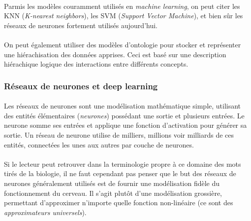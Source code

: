 \documentclass[a4paper,10pt]{article}
\begin{document}
                \paragraph{}
                    Parmis les modèles couramment utilisés en \textit{machine learning}, on peut citer les 
                    KNN (\textit{K-nearest neighbors}), les SVM (\textit{Support Vector Machine}), et bien 
                    sûr les réseaux de neurones fortement utilisés aujourd'hui. 
                    
                \paragraph{}
                    On peut également utiliser des modèles d'ontologie pour stocker et représenter une
                    hiérachisation des données apprises. Ceci est basé sur une description hiérachique logique
                    des interactions entre différents concepts. 
                    
            \subsubsection{Réseaux de neurones et deep learning}
                
                \paragraph{}
                    Les réseaux de neurones sont une modélisation mathématique simple, utilisant
                    des entités élémentaires (\textit{neurones}) possédant une sortie et plusieurs entrées. 
                    Le neurone somme ses entrées et applique une fonction d'activation pour 
                    générer sa sortie. Un réseau de neurone utilise de milliers, millions voir milliards de ces entités, 
                    connectées les unes aux autres par couche de neurones. 
                    
                \paragraph{}
                    Si le lecteur peut retrouver dans la terminologie propre à ce 
                    domaine des mots tirés de la biologie, il ne faut cependant pas penser que 
                    le but des réseaux de neurones généralement utilisés est de fournir une modélisation fidèle 
                    du fonctionnement du cerveau. Il s'agit plutôt d'une modélisation grossière, 
                    permettant d'approximer n'importe quelle fonction non-linéaire (ce sont des 
                    \textit{approximateurs universels}). 
                    
\end{document}
